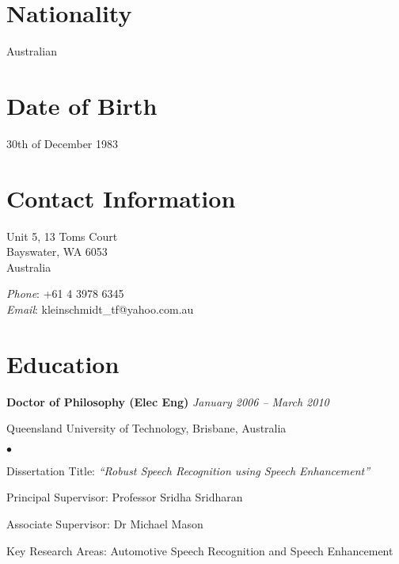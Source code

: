 \documentclass[margin,line]{resume}
\newenvironment{list1}{
  \begin{list}{}{%
      \setlength{\itemsep}{0in}
      \setlength{\parsep}{0in} \setlength{\parskip}{0in}
      \setlength{\topsep}{0in} \setlength{\partopsep}{0in}
      \setlength{\leftmargin}{0.17in}}}{\end{list}}
\newenvironment{list2}{
  \begin{list}{$\bullet$}{%
      \setlength{\itemsep}{0in}
      \setlength{\parsep}{0in} \setlength{\parskip}{0in}
      \setlength{\topsep}{0in} \setlength{\partopsep}{0in}
      \setlength{\leftmargin}{0.2in}}}{\end{list}}
\begin{document}
\begin{resume}

\section{\sc Nationality}
Australian

\section{\sc Date of Birth}
30th of December 1983

\section{\sc Contact Information}

\parbox[t]{3.3in}{%
Unit 5, 13 Toms Court\\
Bayswater, WA 6053\\
Australia
}
\parbox[t]{2.3in}{%
{\it Phone}: +61 4 3978 6345  \\
{\it Email}: {kleinschmidt\_tf@yahoo.com.au}
}



\section{\sc Education}
{\bf Doctor of Philosophy (Elec Eng)} \hfill {\it January 2006 -- March 2010}\\\vspace{-0.85\baselineskip}
\begin{list1}
\item[] Queensland University of Technology, Brisbane, Australia
\begin{list2}
\item Dissertation Title: {\it ``Robust Speech Recognition using Speech Enhancement''}
\item Principal Supervisor:  Professor Sridha Sridharan
\item Associate Supervisor: Dr Michael Mason
\item Key Research Areas: Automotive Speech Recognition and Speech Enhancement
\end{list2}
\end{list1}


\end{resume}
\end{document}
